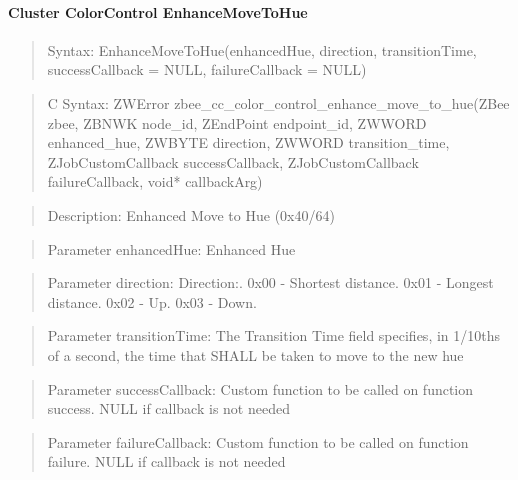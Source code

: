 \paragraph{Cluster ColorControl EnhanceMoveToHue}
\begin{quote}Syntax: EnhanceMoveToHue(enhancedHue, direction, transitionTime, successCallback = NULL, failureCallback = NULL)\end{quote}
\begin{quote}C Syntax: ZWError zbee\_cc\_color\_control\_enhance\_move\_to\_hue(ZBee zbee, ZBNWK node\_id, ZEndPoint endpoint\_id, ZWWORD enhanced\_hue, ZWBYTE direction, ZWWORD transition\_time, ZJobCustomCallback successCallback, ZJobCustomCallback failureCallback, void* callbackArg)\end{quote}
\begin{quote}Description: Enhanced Move to Hue (0x40/64)\end{quote}
\begin{quote}Parameter enhancedHue: Enhanced Hue\end{quote}
\begin{quote}Parameter direction: Direction:. 0x00 - Shortest distance. 0x01 - Longest distance. 0x02 - Up. 0x03 - Down. \end{quote}
\begin{quote}Parameter transitionTime: The Transition Time field specifies, in 1/10ths of a second, the time that SHALL be taken to move to the new hue\end{quote}
\begin{quote}Parameter successCallback: Custom function to be called on function success. NULL if callback is not needed\end{quote}
\begin{quote}Parameter failureCallback: Custom function to be called on function failure. NULL if callback is not needed\end{quote}



